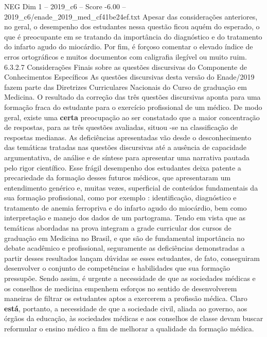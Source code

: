 \begin{textsample}{NEG Dim 1 – 2019\_c6 – Score -6.00 – 2019\_c6/enade\_2019\_med\_cf41be24ef.txt}
Apesar das considerações anteriores, no geral, o desempenho dos estudantes nessa questão ficou aquém do esperado, o que é preocupante em se tratando da importância do diagnóstico e do tratamento do infarto agudo do miocárdio.
Por fim, é forçoso comentar o elevado índice de erros ortográficos e muitos documentos com caligrafia ilegível ou muito ruim. 6.3.2.7 Considerações Finais sobre as questões discursivas do Componente de Conhecimentos Específicos As questões discursivas desta versão do Enade/2019 fazem parte das Diretrizes Curriculares Nacionais do Curso de graduação em Medicina.
O resultado da correção das três questões discursivas aponta para uma formação fraca do estudante para o exercício profissional de um médico.
De modo geral, existe uma \textbf{certa} preocupação ao ser constatado que a maior concentração de respostas, para as três questões avaliadas, situou -se na classificação de respostas medianas.
As deficiências apresentadas vão desde o desconhecimento das temáticas tratadas nas questões discursivas até a ausência de capacidade argumentativa, de análise e de síntese para apresentar uma narrativa pautada pelo rigor científico.
Esse frágil desempenho dos estudantes deixa patente a precariedade da formação desses futuros médicos, que apresentaram um entendimento genérico e, muitas vezes, superficial de conteúdos fundamentais da sua formação profissional, como por exemplo : identificação, diagnóstico e tratamento de anemia ferropriva e do infarto agudo do miocárdio, bem como interpretação e manejo dos dados de um partograma.
Tendo em vista que as temáticas abordadas na prova integram a grade curricular dos cursos de graduação em Medicina no Brasil, e que são de fundamental importância no debate acadêmico e profissional, seguramente as deficiências demonstradas a partir desses resultados lançam dúvidas se esses estudantes, de fato, conseguiram desenvolver o conjunto de competências e habilidades que sua formação pressupõe.
Sendo assim, é urgente a necessidade de que as sociedades médicas e os conselhos de medicina empenhem esforços no sentido de desenvolverem maneiras de filtrar os estudantes aptos a exercerem a profissão médica.
Claro \textbf{está}, portanto, a necessidade de que a sociedade civil, aliada ao governo, aos órgãos da educação, às sociedades médicas e aos conselhos de classe devam buscar reformular o ensino médico a fim de melhorar a qualidade da formação médica.

\end{textsample}
